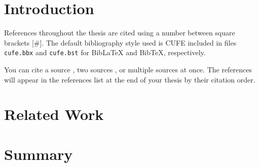 \setlength{\parskip}{\baselineskip}

\section{Introduction}
References throughout the thesis are cited using a number between square brackets [\#]. The default bibliography style used is CUFE included in files \texttt{cufe.bbx} and \texttt{cufe.bst} for BibLaTeX and BibTeX, respectively. 

You can cite a source \cite{Najm2010}, two sources \cite{Davis2010,KLU_UserGuide}, or multiple sources \cite{Nagel1975, Nguyen2008, Freeman2004, Vladimirescu1994, NgspiceManual, GnuplotManual} at once. The references will appear in the references list at the end of your thesis by their citation order.
\section{Related Work}
\lipsum[150]
\section{Summary}
\lipsum[100]

